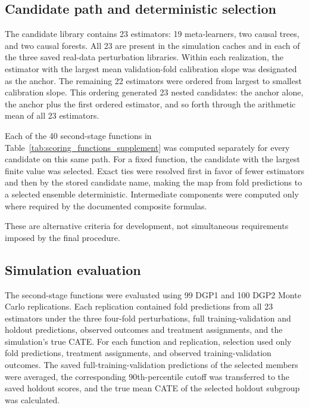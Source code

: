 \documentclass[12pt]{article}
\begin{document}
\subsection{Candidate path and deterministic selection}

The candidate library contains 23 estimators: 19 meta-learners, two causal trees, and two causal forests. All 23 are present in the simulation caches and in each of the three saved real-data perturbation libraries. Within each realization, the estimator with the largest mean validation-fold calibration slope was designated as the anchor. The remaining 22 estimators were ordered from largest to smallest calibration slope. This ordering generated 23 nested candidates: the anchor alone, the anchor plus the first ordered estimator, and so forth through the arithmetic mean of all 23 estimators.

Each of the 40 second-stage functions in Table~\ref{tab:scoring_functions_supplement} was computed separately for every candidate on this same path. For a fixed function, the candidate with the largest finite value was selected. Exact ties were resolved first in favor of fewer estimators and then by the stored candidate name, making the map from fold predictions to a selected ensemble deterministic. Intermediate components were computed only where required by the documented composite formulas.

These are alternative criteria for development, not simultaneous requirements imposed by the final procedure.

\begingroup{}

\endgroup

\subsection{Simulation evaluation}

The second-stage functions were evaluated using 99 DGP1 and 100 DGP2 Monte Carlo replications. Each replication contained fold predictions from all 23 estimators under the three four-fold perturbations, full training-validation and holdout predictions, observed outcomes and treatment assignments, and the simulation's true CATE. For each function and replication, selection used only fold predictions, treatment assignments, and observed training-validation outcomes. The saved full-training-validation predictions of the selected members were averaged, the corresponding 90th-percentile cutoff was transferred to the saved holdout scores, and the true mean CATE of the selected holdout subgroup was calculated.
\end{document}
